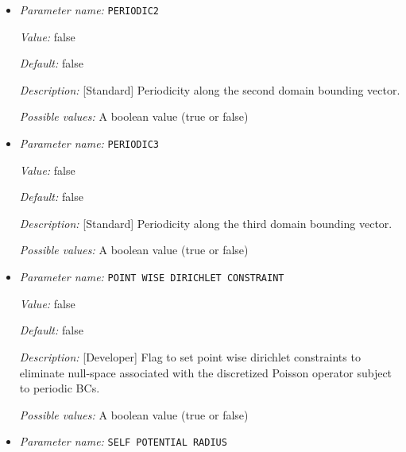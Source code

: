\begin{itemize}
{\it Value:} false


{\it Default:} false


{\it Description:} [Standard] Periodicity along the first domain bounding vector.


{\it Possible values:} A boolean value (true or false)
\item {\it Parameter name:} {\tt PERIODIC2}
\label{parameters:Boundary conditions/PERIODIC2}
\label{parameters:Boundary_20conditions/PERIODIC2}


{\it Value:} false


{\it Default:} false


{\it Description:} [Standard] Periodicity along the second domain bounding vector.


{\it Possible values:} A boolean value (true or false)
\item {\it Parameter name:} {\tt PERIODIC3}
\label{parameters:Boundary conditions/PERIODIC3}
\label{parameters:Boundary_20conditions/PERIODIC3}


{\it Value:} false


{\it Default:} false


{\it Description:} [Standard] Periodicity along the third domain bounding vector.


{\it Possible values:} A boolean value (true or false)
\item {\it Parameter name:} {\tt POINT WISE DIRICHLET CONSTRAINT}
\label{parameters:Boundary conditions/POINT WISE DIRICHLET CONSTRAINT}
\label{parameters:Boundary_20conditions/POINT_20WISE_20DIRICHLET_20CONSTRAINT}


{\it Value:} false


{\it Default:} false


{\it Description:} [Developer] Flag to set point wise dirichlet constraints to eliminate null-space associated with the discretized Poisson operator subject to periodic BCs.


{\it Possible values:} A boolean value (true or false)
\item {\it Parameter name:} {\tt SELF POTENTIAL RADIUS}
\label{parameters:Boundary conditions/SELF POTENTIAL RADIUS}
\label{parameters:Boundary_20conditions/SELF_20POTENTIAL_20RADIUS}



\end{itemize}

